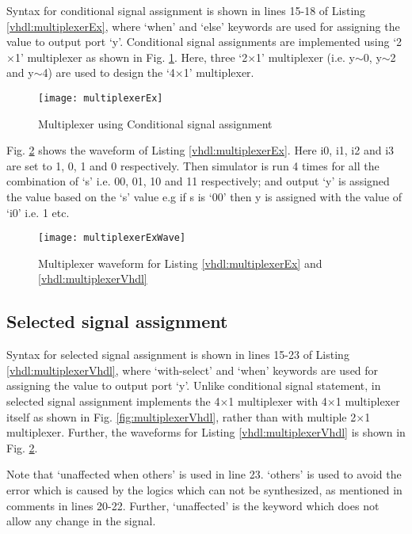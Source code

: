 Syntax for conditional signal assignment is shown in lines 15-18 of Listing \ref{vhdl:multiplexerEx}, where `when' and `else' keywords are used for assigning the value to output port `y'. Conditional signal assignments are implemented using `2$\times$1' multiplexer as shown in Fig. \ref{fig:multiplexerEx}. Here, three `2$\times$1' multiplexer (i.e. y$\sim$0, y$\sim$2 and y$\sim$4) are used to design the `4$\times$1' multiplexer.




\begin{figure}[!h]
	\centering
	\texttt{[image: multiplexerEx]}
	\caption{Multiplexer using Conditional signal assignment}
	\label{fig:multiplexerEx}
\end{figure}

Fig. \ref{fig:multiplexerExWave} shows the waveform of Listing \ref{vhdl:multiplexerEx}. Here i0, i1, i2 and i3 are set to 1, 0, 1 and 0 respectively. Then simulator is run 4 times for all the combination of `s' i.e. 00, 01, 10 and 11 respectively; and output `y' is assigned the value based on the `s' value e.g if s is `00' then y is assigned with the value of `i0' i.e. 1 etc.  

\begin{figure}[!h]
	\centering
	\texttt{[image: multiplexerExWave]}
	\caption{Multiplexer waveform for Listing \ref{vhdl:multiplexerEx} and \ref{vhdl:multiplexerVhdl}}
	\label{fig:multiplexerExWave}
\end{figure}



\subsection{Selected signal assignment}
Syntax for selected signal assignment is shown in lines 15-23 of Listing \ref{vhdl:multiplexerVhdl}, where `with-select' and `when' keywords are used for assigning the value to output port `y'. Unlike conditional signal statement, in selected signal assignment implements the 4$\times$1 multiplexer with 4$\times$1 multiplexer itself as shown in Fig. \ref{fig:multiplexerVhdl}, rather than with multiple 2$\times$1 multiplexer. Further, the waveforms for Listing \ref{vhdl:multiplexerVhdl} is shown in Fig. \ref{fig:multiplexerExWave}.

Note that `unaffected when others' is used in line 23.  `others' is used to avoid the error which is caused by the logics which can not be synthesized,  as mentioned in comments in lines 20-22. Further, `unaffected' is the keyword which does not allow any change in the signal.


